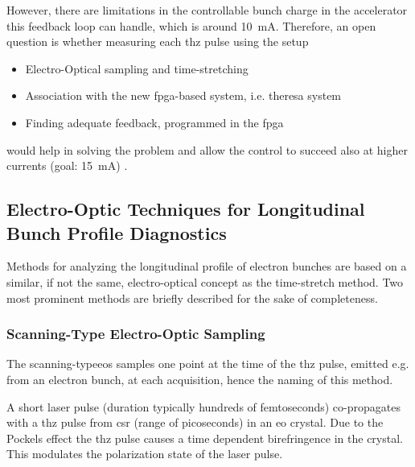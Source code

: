 However, there are limitations in the controllable bunch charge in the accelerator this feedback loop can handle, which is around \SI{10}{\milli \ampere}. 
Therefore, an open question is whether measuring each \gls{thz} pulse using the setup
\begin{itemize}
	\item Electro-Optical sampling and time-stretching
	\item Association with the new \gls{fpga}-based system, i.e. \gls{theresa} system
	\item Finding adequate feedback, programmed in the \gls{fpga}
\end{itemize}
would help in solving the problem and allow the control to succeed also at higher currents (goal: \SI{15}{\milli \ampere}) \cite{bielwaski}.

\subsection{Electro-Optic Techniques for Longitudinal Bunch Profile Diagnostics}
Methods for analyzing the longitudinal profile of electron bunches are based on a similar, if not the same, electro-optical concept as the time-stretch method. 
Two most prominent methods are briefly described for the sake of completeness.
\subsubsection*{Scanning-Type Electro-Optic Sampling}
The scanning-type\gls{eos} samples one point at the time of the \gls{thz} pulse, emitted e.g. from an electron bunch, at each acquisition, hence the naming of this method.

A short laser pulse (duration typically hundreds of femtoseconds) co-propagates with a \gls{thz} pulse from \gls{csr} (range of picoseconds) in an \gls{eo} crystal. 
Due to the Pockels effect the \gls{thz} pulse causes a time dependent birefringence in the crystal.
This modulates the polarization state of the laser pulse.

